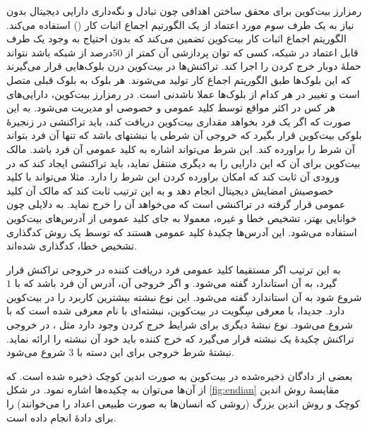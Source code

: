 رمزارز بیت‌کوین برای محقق ساختن اهدافی چون تبادل و نگه‌داری دارایی دیجیتال بدون نیاز به یک طرف سوم مورد اعتماد از یک الگورتیم اجماع اثبات کار
()
استفاده می‌کند\cite{Nakamoto2009}. الگوریتم اجماع اثبات کار بیت‌کوین تضمین می‌کند که بدون احتیاج به  وجود یک طرف قابل اعتماد در شبکه، کسی که توان پردازشی آن کمتر از $50$درصد از شبکه باشد نتواند حملهٔ دوبار خرج کردن
را اجرا کند. تراکنش‌ها در بیت‌کوین درن بلوک‌هایی قرار می‌گیرند که این بلوک‌ها طبق الگوریتم اجماع کار تولید می‌شوند. هر بلوک به بلوک قبلی متصل است و تغییر در هر کدام از بلوک‌ها عملا ناشدنی است. در رمزارز بیت‌کوین، دارایی‌های هر کس در اکثر مواقع توسط کلید عمومی و خصوصی او مدیریت می‌شود. به این صورت که اگر یک فرد بخواهد مقداری بیت‌کوین دریافت کند، باید تراکنشی در زنجیرهٔ بلوکی بیت‌کوین قرار بگیرد که خروجی آن شرطی یا نبشتهای باشد که تنها آن فرد بتواند آن شرط را براورده کند. این شرط می‌تواند اشاره به کلید عمومی آن فرد باشد. مالک بیت‌کوین برای آن که این دارایی را به دیگری منتقل نماید، باید تراکنشی ایجاد کند که در ورودی آن ثابت کند که امکان براورده کردن این شرط را دارد. مثلا می‌تواند با کلید خصوصیش امضایش دیجیتال انجام دهد و به این ترتیب ثابت کند که مالک آن کلید عمومی قرار گرفته در تراکنشی است که می‌خواهد آن را خرج نماید. به دلایلی چون خوانایی بهتر، تشخیص خطا و غیره، معمولا به جای کلید عمومی از آدرس‌های بیت‌کوین استفاده می‌شود. این آدرس‌ها چکیدهٔ کلید عمومی هستند که توسط یک روش کدگذاری تشخیص خطا، کدگذاری شده‌اند.

به این ترتیب اگر مستقیما کلید عمومی فرد دریافت کننده در خروجی تراکنش قرار گیرد، به آن استاندارد
 گفته می‌شود. و اگر خروجی آن، آدرس آن فرد باشد که با $1$ شروع شود به آن استاندارد 
گفته می‌شود. این نوع نبشته بیشترین کاربرد را در بیت‌کوین دارد. جدیدا، با معرفی سِگویت در بیت‌کوین، نبشته‌ای با نام 
معرفی شده است که با  شروع می‌شود. نوع نبشه‌ٔ دیگری برای شرایط خرج کردن وجود دارد مثل 
، در خروجی تراکنش چکیدهٔ یک نبشته قرار می‌گیرد که خرج کننده باید خود آن نبشته‌ را ارائه نماید. نبشتهٔ شرط خروجی برای این دسته با $3$ شروع می‌شود.

بعضی از دادگان ذخیره‌شده در بیت‌کوین به صورت 
اندین کوچک
ذخیره شده است. که از آن‌ها می‌توان به چکیده‌ها اشاره نمود. در شکل \ref{fig:endian} مقایسهٔ روش اندین کوچک و روش اندین بزرگ  (روشی که انسان‌ها به صورت طبیعی اعداد را می‌خوانند) را برای دادهٔ  انجام داده است.

